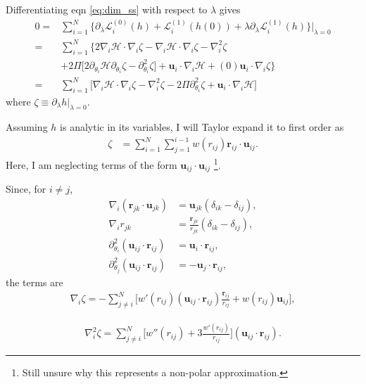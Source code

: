\documentclass[twocolumn,amsmath,amssymb,aps]{revtex4-1}%
\begin{document}
Differentiating eqn \ref{eq:dim_ss} with respect to $\lambda$ gives
\begin{align}\label{eq:first_perturb_DE}
  0
  =&\sum_{i=1}^N\big\{\partial_{\lambda}\mathcal{L}_i^{(0)}(h)
    + \mathcal{L}_i^{(1)}(h(0))
    +\lambda\partial_{\lambda}\mathcal{L}_i^{(1)}
    (h)\big\}\bigg|_{\lambda=0}\nonumber\\
  =&\sum_{i=1}^N\big\{2\nabla_i \mathcal{H}\cdot\nabla_i\zeta
    - \nabla_i\mathcal{H}\cdot\nabla_i\zeta
    -\nabla_i^2\zeta\nonumber\\
    &+2\Pi\big[2\partial_{\theta_i}\mathcal{H}\partial_{\theta_i}\zeta
    -\partial_{\theta_i}^2\zeta\big]
    + \bm{u}_i\cdot\nabla_i\mathcal{H}
    +(0)\bm{u}_i\cdot\nabla_i\zeta\big\}\nonumber\\
  =&\sum_{i=1}^N\big[\nabla_i \mathcal{H}\cdot\nabla_i\zeta
    -\nabla_i^2\zeta - 2\Pi
    \partial_{\theta_i}^2\zeta
    + \bm{u}_i\cdot\nabla_i\mathcal{H}\big]
\end{align}
where $\zeta\equiv\partial_{\lambda}h|_{\lambda=0}$.

Assuming $h$ is analytic in its variables, I will Taylor expand it to
first order as
\begin{align}\label{eq:zetaform}
  \zeta &= \sum_{i=1}^N\sum_{j=1}^{i-1}
      w(r_{ij})\bm{r}_{ij}\cdot\bm{u}_{ij}.
\end{align}
Here, I am neglecting terms of the form $\bm{u}_{ij}\cdot\bm{u}_{ij}$
\footnote{Still unsure why this represents a non-polar approximation.}.


Since, for $i\neq j$,
\begin{align}
  \nabla_i(\bm{r}_{jk}\cdot\bm{u}_{jk})
  &= \bm{u}_{jk}(\delta_{ik}-\delta_{ij}),\\
  \nabla_i r_{jk}
  &=\frac{\bm{r}_{jk}}{r_{jk}}(\delta_{ik}-\delta_{ij}),\\
  \partial_{\theta_i}^2(\bm{u}_{ij}\cdot\bm{r}_{ij})
  &=\bm{u}_i\cdot\bm{r}_{ij},\\
  \partial_{\theta_j}^2(\bm{u}_{ij}\cdot\bm{r}_{ij})
  &=-\bm{u}_j\cdot\bm{r}_{ij},
\end{align}
the terms are
\begin{align}
  \nabla_{i}\zeta = -\sum_{j\neq i}^N \bigg[w'(r_{ij})
  (\bm{u}_{ij}\cdot\bm{r}_{ij})\frac{\bm{r}_{ij}}{r_{ij}}
  +w(r_{ij})\bm{u}_{ij}\bigg],
\end{align}

\begin{align}
  \nabla_i^2\zeta=\sum_{j\neq i}^N\bigg[w''(r_{ij})
  +3\frac{w'(r_{ij})}{r_{ij}}\bigg](\bm{u}_{ij}\cdot\bm{r}_{ij}).
\end{align}
\end{document}
